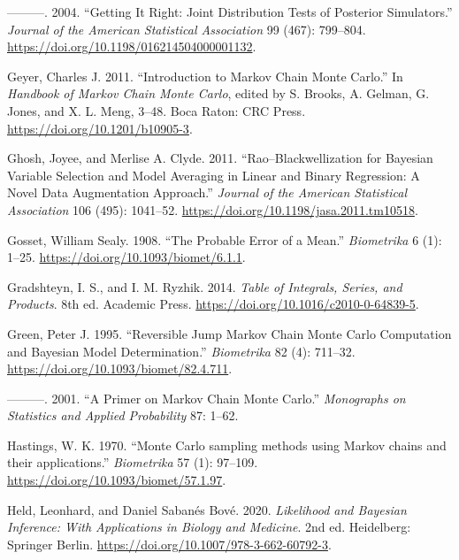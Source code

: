 \documentclass[
  11pt,
  letterpaper,
]{scrbook}
\newlength{\cslhangindent}
\newenvironment{CSLReferences}[2] %
 {\begin{list}{}{%
  \setlength{\itemindent}{0pt}
  \setlength{\leftmargin}{0pt}
  \setlength{\parsep}{0pt}
  \ifodd #1
   \setlength{\leftmargin}{\cslhangindent}
   \setlength{\itemindent}{-1\cslhangindent}
  \fi
  \setlength{\itemsep}{#2\baselineskip}}}
 {\end{list}}
\theoremstyle{plain}
\theoremstyle{plain}
\theoremstyle{plain}
\theoremstyle{definition}
\theoremstyle{definition}
\theoremstyle{definition}
\theoremstyle{remark}
\begin{document}
\begin{CSLReferences}{1}{0}
---------. 2004. {``Getting It Right: Joint Distribution Tests of
Posterior Simulators.''} \emph{Journal of the American Statistical
Association} 99 (467): 799--804.
\url{https://doi.org/10.1198/016214504000001132}.

Geyer, Charles J. 2011. {``Introduction to {M}arkov Chain {M}onte
{C}arlo.''} In \emph{Handbook of {M}arkov Chain {M}onte {C}arlo}, edited
by S. Brooks, A. Gelman, G. Jones, and X. L. Meng, 3--48. Boca Raton:
CRC Press. \url{https://doi.org/10.1201/b10905-3}.

Ghosh, Joyee, and Merlise A. Clyde. 2011. {``{R}ao--{B}lackwellization
for {B}ayesian Variable Selection and Model Averaging in Linear and
Binary Regression: A Novel Data Augmentation Approach.''} \emph{Journal
of the American Statistical Association} 106 (495): 1041--52.
\url{https://doi.org/10.1198/jasa.2011.tm10518}.

Gosset, William Sealy. 1908. {``The Probable Error of a Mean.''}
\emph{Biometrika} 6 (1): 1--25.
\url{https://doi.org/10.1093/biomet/6.1.1}.

Gradshteyn, I. S., and I. M. Ryzhik. 2014. \emph{Table of Integrals,
Series, and Products}. 8th ed. Academic Press.
\url{https://doi.org/10.1016/c2010-0-64839-5}.

Green, Peter J. 1995. {``Reversible Jump {M}arkov Chain {M}onte {C}arlo
Computation and {B}ayesian Model Determination.''} \emph{Biometrika} 82
(4): 711--32. \url{https://doi.org/10.1093/biomet/82.4.711}.

---------. 2001. {``A Primer on {M}arkov Chain {M}onte {C}arlo.''}
\emph{Monographs on Statistics and Applied Probability} 87: 1--62.

Hastings, W. K. 1970. {``{Monte {C}arlo sampling methods using {M}arkov
chains and their applications}.''} \emph{Biometrika} 57 (1): 97--109.
\url{https://doi.org/10.1093/biomet/57.1.97}.

Held, Leonhard, and Daniel Sabanés Bové. 2020. \emph{Likelihood and
{B}ayesian Inference: With Applications in Biology and Medicine}. 2nd
ed. Heidelberg: Springer Berlin.
\url{https://doi.org/10.1007/978-3-662-60792-3}.


\end{CSLReferences}
\end{document}
